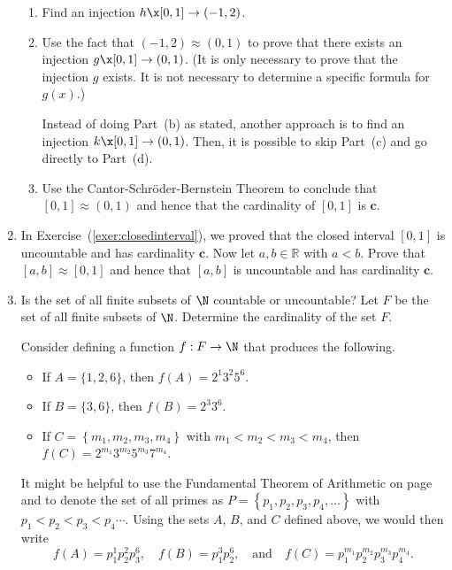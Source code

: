 \begin{enumerate}
\begin{enumerate}
\item Find an injection $h\x  [ 0, 1 ] \to ( -1, 2 )$.

\item Use the fact that $( -1, 2 ) \approx ( 0, 1 )$ to prove that there exists an injection 
$g\x  [ 0, 1 ] \to ( 0, 1 )$.  (It is only necessary to prove that the injection $g$ exists.  It is not necessary to determine a specific formula for 
$g ( x )$.)  

\note  Instead of doing Part~(b) as stated, another approach is to find an injection 
$k \x [0, 1] \to (0, 1)$.  Then, it is possible to skip Part~(c) and go directly to Part~(d).

\item Use the Cantor-Schr\"{o}der-Bernstein Theorem to conclude that \linebreak
$[ 0, 1 ] \approx ( 0, 1 )$ and hence that the cardinality of 
$[ 0, 1 ]$ is $\boldsymbol{c}$.
\end{enumerate}

\item In Exercise~(\ref{exer:closedinterval}), we proved that the closed interval $[ 0, 1 ]$ is uncountable and has cardinality $\boldsymbol{c}$.  Now let $a, b \in \mathbb{R}$ with $a < b$.  Prove that 
$[ a, b ] \approx [ 0, 1 ]$ and hence that $[ a, b ]$ is uncountable and has cardinality $\boldsymbol{c}$.



\item Is the set of all finite subsets of $\N$ countable or uncountable? Let $F$ be the set of all finite subsets of $\N$.  Determine the cardinality of the set $F$.

\eighth
\noindent
Consider defining a function $f:F \to \N$ that produces the following.
\begin{itemize}
  \item If $A = \{1, 2, 6 \}$, then $f(A) = 2^1 3^2 5^6$.
  \item If $B = \{3, 6 \}$, then $f(B) = 2^3 3^6$.
  \item If $C = \left\{ m_1, m_2, m_3, m_4 \right\}$ with $m_1 < m_2 < m_3 < m_4$, then 
           $f(C) = 2^{m_1} 3^{m_2} 5^{m_3} 7^{m_4}$.
\end{itemize}
It might be helpful to use the Fundamental Theorem of Arithmetic on page~\pageref{T:fundtheorem} and to denote the set of all primes as  $P = \left\{ p_1, p_2, p_3, p_4, \ldots \right\}$ with $p_1 < p_2 < p_3 < p_4 \cdots$.  Using the sets $A$, $B$, and $C$ defined above, we would then write
\[
f(A) = p_1^1 p_2^2 p_3^6, \quad f(B) = p_1^3 p_2^6, \quad \text{and} \quad f(C) = p_1^{m_1} p_2^{m_2} p_3^{m_3} p_4^{m_4}.
\]


\end{enumerate}
